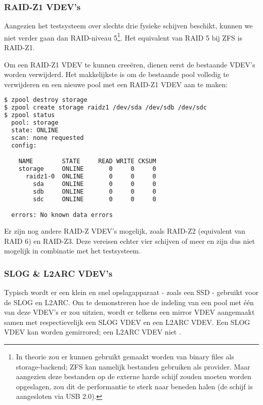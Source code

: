 \subsubsection{RAID-Z1 VDEV's}

Aangezien het testsysteem over slechts drie fysieke schijven beschikt, kunnen we niet verder gaan dan RAID-niveau 5\footnote{In theorie zou er kunnen gebruikt gemaakt worden van binary files als storage-backend; ZFS kan namelijk bestanden gebruiken als provider. Maar aangezien deze bestanden op de externe harde schijf zouden moeten worden opgeslagen, zou dit de \gls{performantie} te sterk naar beneden halen (de schijf is aangesloten via USB 2.0).}. Het equivalent van RAID 5 bij ZFS is RAID-Z1.  

Om een RAID-Z1 VDEV te kunnen creeëren, dienen eerst de bestaande VDEV's worden verwijderd. Het makkelijkste is om de bestaande pool volledig te verwijderen en een nieuwe pool met een RAID-Z1 VDEV aan te maken:

\begin{lstlisting}[language=bash,style=command_style]
$ zpool destroy storage
$ zpool create storage raidz1 /dev/sda /dev/sdb /dev/sdc
$ zpool status
  pool: storage
  state: ONLINE
  scan: none requested
  config:

	NAME        STATE     READ WRITE CKSUM
	storage     ONLINE       0     0     0
	  raidz1-0  ONLINE       0     0     0
	    sda     ONLINE       0     0     0
	    sdb     ONLINE       0     0     0
	    sdc     ONLINE       0     0     0

  errors: No known data errors
\end{lstlisting}

Er zijn nog andere RAID-Z VDEV's mogelijk, zoals RAID-Z2 (equivalent van RAID 6) en RAID-Z3. Deze vereisen echter vier schijven of meer en zijn dus niet mogelijk in combinatie met het testsysteem.

\subsubsection{SLOG \& L2ARC VDEV's}

Typisch wordt er een klein en snel opslagapparaat - zoals een SSD - gebruikt voor de SLOG en L2ARC. Om te demonstreren hoe de indeling van een pool met één van deze VDEV's er zou uitzien, wordt er telkens een mirror VDEV aangemaakt samen met respectievelijk een SLOG VDEV en een L2ARC VDEV. Een SLOG VDEV kan worden gemirrored; een L2ARC VDEV niet \autocite{FBSDDP2017}.

